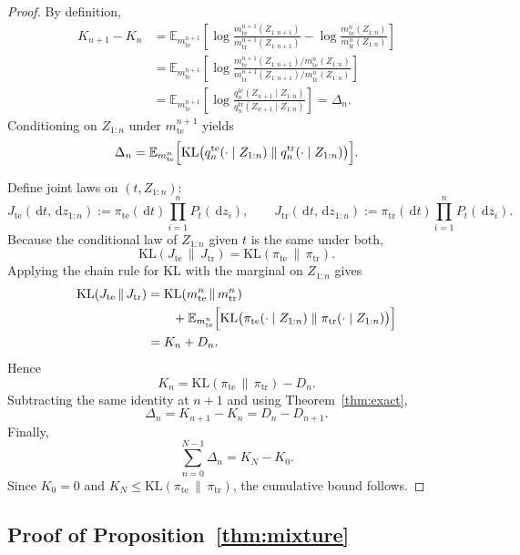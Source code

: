 \documentclass{article}
\theoremstyle{definition}
\theoremstyle{remark}
\newcommand{\E}{\mathbb{E}}
\newcommand{\KL}{\mathrm{KL}}
\newcommand{\tr}{\mathrm{tr}}
\newcommand{\te}{\mathrm{te}}
\newcommand{\dd}{\,\mathrm{d}}
\begin{document}
\begin{proof}
By definition,
\begin{align*}
K_{n+1}-K_n
&=
\E_{m_{\te}^{n+1}}
\left[
\log\frac{m_{\te}^{n+1}(Z_{1:n+1})}{m_{\tr}^{n+1}(Z_{1:n+1})}
-
\log\frac{m_{\te}^{n}(Z_{1:n})}{m_{\tr}^{n}(Z_{1:n})}
\right] \\
&=
\E_{m_{\te}^{n+1}}
\left[
\log
\frac{
m_{\te}^{n+1}(Z_{1:n+1}) / m_{\te}^{n}(Z_{1:n})
}{
m_{\tr}^{n+1}(Z_{1:n+1}) / m_{\tr}^{n}(Z_{1:n})
}
\right] \\
&=
\E_{m_{\te}^{n+1}}
\left[
\log
\frac{
q_n^{\te}(Z_{n+1}\mid Z_{1:n})
}{
q_n^{\tr}(Z_{n+1}\mid Z_{1:n})
}
\right]
=
\Delta_n.
\end{align*}
Conditioning on $Z_{1:n}$ under $m_{\te}^{n+1}$ yields
\[
\Delta_n
=
\E_{m_{\te}^{n}}
\Bigl[
\KL\bigl(
q_n^{\te}(\cdot\mid Z_{1:n})
\;\|\;
q_n^{\tr}(\cdot\mid Z_{1:n})
\bigr)
\Bigr].
\]

Define joint laws on $(t,Z_{1:n})$:
\[
J_{\te}(\dd t,\dd z_{1:n})
:=
\pi_{\te}(\dd t)\prod_{i=1}^n P_t(\dd z_i),
\qquad
J_{\tr}(\dd t,\dd z_{1:n})
:=
\pi_{\tr}(\dd t)\prod_{i=1}^n P_t(\dd z_i).
\]
Because the conditional law of $Z_{1:n}$ given $t$ is the same under both,
\[
\KL(J_{\te}\,\|\,J_{\tr})=\KL(\pi_{\te}\,\|\,\pi_{\tr}).
\]
Applying the chain rule for KL with the marginal on $Z_{1:n}$ gives
\begin{align*}
\KL(J_{\te}\,\|\,J_{\tr})
&=
\KL(m_{\te}^{n}\,\|\,m_{\tr}^{n}) \\
&\qquad
+ \E_{m_{\te}^{n}}
\Bigl[
\KL\bigl(
\pi_{\te}(\cdot\mid Z_{1:n})
\;\|\;
\pi_{\tr}(\cdot\mid Z_{1:n})
\bigr)
\Bigr] \\
&=
K_n + D_n.
\end{align*}
Hence
\[
K_n=\KL(\pi_{\te}\,\|\,\pi_{\tr})-D_n.
\]
Subtracting the same identity at $n+1$ and using Theorem~\ref{thm:exact},
\[
\Delta_n = K_{n+1}-K_n = D_n-D_{n+1}.
\]
Finally,
\[
\sum_{n=0}^{N-1}\Delta_n
=
K_N-K_0.
\]
Since $K_0=0$ and $K_N\le \KL(\pi_{\te}\,\|\,\pi_{\tr})$, the cumulative bound follows.
\end{proof}

\subsection{Proof of Proposition~\ref{thm:mixture}}
\label{app:exact-proofs}
\end{document}
